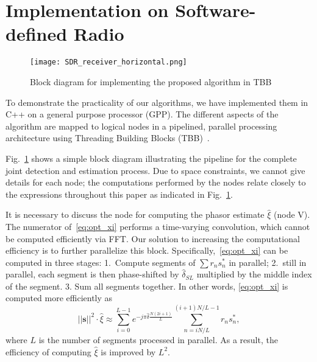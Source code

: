\section{Implementation on Software-defined Radio}%
\label{sec:implementation_on_SDR}

\begin{figure}[t]
    \centerline{\texttt{[image: SDR\_receiver\_horizontal.png]}}
    \caption{Block diagram for implementing the proposed algorithm in TBB}
    \label{fig:SDR_receiver}
    \end{figure}

To demonstrate the practicality of our algorithms, we have implemented them in C++ on a general
purpose processor (GPP).
The different aspects of the algorithm are mapped to logical nodes in a pipelined, parallel processing architecture
using Threading Building Blocks (TBB)~\cite{Michael_19}.

Fig.~\ref{fig:SDR_receiver} shows a simple block diagram
illustrating the pipeline for the complete joint detection and
estimation process.
Due to space constraints, we cannot give details for each node; the
computations performed by the nodes relate closely to the expressions
throughout this paper
as
indicated in Fig.~\ref{fig:SDR_receiver}.

It is necessary to discuss the node for computing the phasor estimate $\hat{\xi}$ (node V). 
The numerator of~\eqref{eq:opt_xi} performs a time-varying
convolution,
which cannot be computed efficiently via FFT.
Our solution to increasing the computational efficiency is to further
parallelize this block.
Specifically,~\eqref{eq:opt_xi} can be computed in three stages:
1.~Compute  segments of $\sum r_ns_n^*$ in  parallel;
2.~still in parallel, each segment is then phase-shifted by $\hat{\delta}_{SL}$
multiplied by the middle index of the 
segment.
3. Sum all segments together.
In other words, \eqref{eq:opt_xi} is computed more efficiently as
\begin{equation}
  \label{eq:refined_opt_S}
  ||\bm{s}||^2\cdot\hat{\xi} \approx \sum_{i=0}^{L-1} e^{-j\pi \hat{\delta}\frac{N(2i+1)}{L}}
  \sum_{n=iN/L}^{(i+1)N/L-1}r_ns_n^*,
\end{equation}
where $L$ is the number of segments processed in parallel.
As a result,
the efficiency of computing $\hat{\xi}$ is improved by $L^2$.

